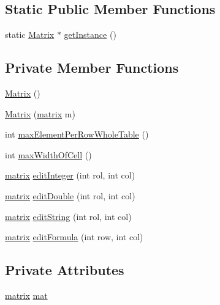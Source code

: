 \subsection*{Static Public Member Functions}
\begin{DoxyCompactItemize}
\item 
static \hyperlink{class_matrix}{Matrix} $\ast$ \hyperlink{class_matrix_a0c8e09a50ddb4d068d39456ea130abcc}{get\+Instance} ()
\end{DoxyCompactItemize}
\subsection*{Private Member Functions}
\begin{DoxyCompactItemize}
\item 
\hyperlink{class_matrix_a2dba13c45127354c9f75ef576f49269b}{Matrix} ()
\item 
\hyperlink{class_matrix_abc64f3d5a4f22323a24be2bfabf377cb}{Matrix} (\hyperlink{formula_8h_a869e2a5deeb3daa4c82d6bc91cf20d92}{matrix} m)
\item 
int \hyperlink{class_matrix_a8620c5426a31cf8fe0072df32bb3f65d}{max\+Element\+Per\+Row\+Whole\+Table} ()
\item 
int \hyperlink{class_matrix_a60dac9b70e73a12d2adb32d6be9ff65d}{max\+Width\+Of\+Cell} ()
\item 
\hyperlink{formula_8h_a869e2a5deeb3daa4c82d6bc91cf20d92}{matrix} \hyperlink{class_matrix_a91c66e2961a16adf56b8d58b916d2d46}{edit\+Integer} (int rol, int col)
\item 
\hyperlink{formula_8h_a869e2a5deeb3daa4c82d6bc91cf20d92}{matrix} \hyperlink{class_matrix_a147d3813e96ef757fb0d5ff65e5f97ef}{edit\+Double} (int rol, int col)
\item 
\hyperlink{formula_8h_a869e2a5deeb3daa4c82d6bc91cf20d92}{matrix} \hyperlink{class_matrix_a7029d8a3cd3c691b46adfd777abc880c}{edit\+String} (int rol, int col)
\item 
\hyperlink{formula_8h_a869e2a5deeb3daa4c82d6bc91cf20d92}{matrix} \hyperlink{class_matrix_af3d26e46fcec1a98380b1af04f008f22}{edit\+Formula} (int row, int col)
\end{DoxyCompactItemize}
\subsection*{Private Attributes}
\begin{DoxyCompactItemize}
\item 
\hyperlink{formula_8h_a869e2a5deeb3daa4c82d6bc91cf20d92}{matrix} \hyperlink{class_matrix_a1b0c75c45092426431308172aab92c66}{mat}
\end{DoxyCompactItemize}
